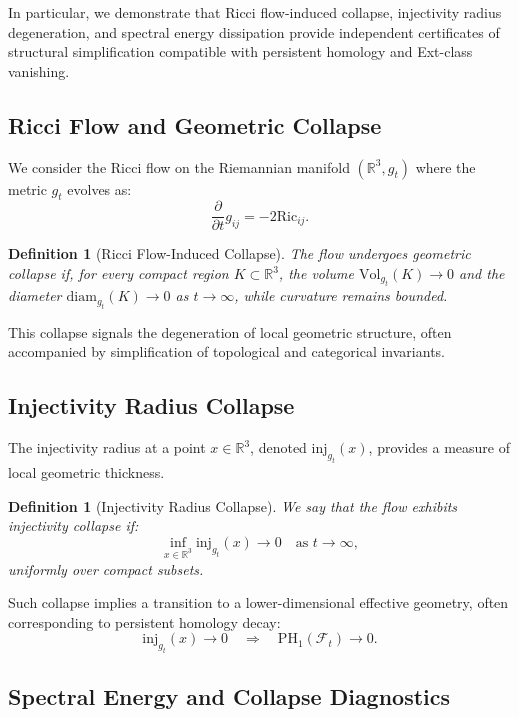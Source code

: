 \documentclass[11pt]{article}
\newtheorem{definition}[theorem]{Definition}
\begin{document}
In particular, we demonstrate that Ricci flow-induced collapse, injectivity radius degeneration, and spectral energy dissipation provide independent certificates of structural simplification compatible with persistent homology and Ext-class vanishing.

\subsection{Ricci Flow and Geometric Collapse}

We consider the Ricci flow on the Riemannian manifold \( (\mathbb{R}^3, g_t) \) where the metric \( g_t \) evolves as:
\[
\frac{\partial}{\partial t} g_{ij} = -2 \mathrm{Ric}_{ij}.
\]

\begin{definition}[Ricci Flow-Induced Collapse]
The flow undergoes \emph{geometric collapse} if, for every compact region \( K \subset \mathbb{R}^3 \), the volume \( \mathrm{Vol}_{g_t}(K) \to 0 \) and the diameter \( \mathrm{diam}_{g_t}(K) \to 0 \) as \( t \to \infty \), while curvature remains bounded.
\end{definition}

This collapse signals the degeneration of local geometric structure, often accompanied by simplification of topological and categorical invariants.

\subsection{Injectivity Radius Collapse}

The injectivity radius at a point \( x \in \mathbb{R}^3 \), denoted \( \mathrm{inj}_{g_t}(x) \), provides a measure of local geometric thickness.

\begin{definition}[Injectivity Radius Collapse]
We say that the flow exhibits injectivity collapse if:
\[
\inf_{x \in \mathbb{R}^3} \mathrm{inj}_{g_t}(x) \to 0 \quad \text{as } t \to \infty,
\]
uniformly over compact subsets.
\end{definition}

Such collapse implies a transition to a lower-dimensional effective geometry, often corresponding to persistent homology decay:
\[
\mathrm{inj}_{g_t}(x) \to 0 \quad \Rightarrow \quad \mathrm{PH}_1(\mathcal{F}_t) \to 0.
\]

\subsection{Spectral Energy and Collapse Diagnostics}
\end{document}
